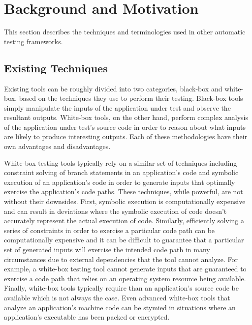 

\section{Background and Motivation}

    This section describes the techniques and terminologies used in other automatic testing frameworks.

    \subsection{Existing Techniques}

        Existing tools can be roughly divided into two categories, black-box and white-box, based on the techniques they
        use to perform their testing. Black-box tools simply manipulate the inputs of the application under test and
        observe the resultant outputs. White-box tools, on the other hand, perform complex analysis of the application
        under test's source code in order to reason about what inputs are likely to produce interesting outputs. Each of
        these methodologies have their own advantages and disadvantages.

        White-box testing tools typically rely on a similar set of techniques including constraint solving of branch
        statements in an application's code and symbolic execution of an application's code in order to generate inputs
        that optimally exercise the application's code paths. These techniques, while powerful, are not without their
        downsides.  First, symbolic execution is computationally expensive and can result in deviations where the
        symbolic execution of code doesn't accurately represent the actual execution of code.  Similarly, efficiently
        solving a series of constraints in order to exercise a particular code path can be computationally expensive and
        it can be difficult to guarantee that a particular set of generated inputs will exercise the intended code path
        in many circumstances due to external dependencies that the tool cannot analyze. For example, a white-box
        testing tool cannot generate inputs that are guaranteed to exercise a code path that relies on an operating
        system resource being available. Finally, white-box tools typically require than an application's source code be
        available which is not always the case. Even advanced white-box tools that analyze an application's machine code
        can be stymied in situations where an application's executable has been packed or encrypted.


